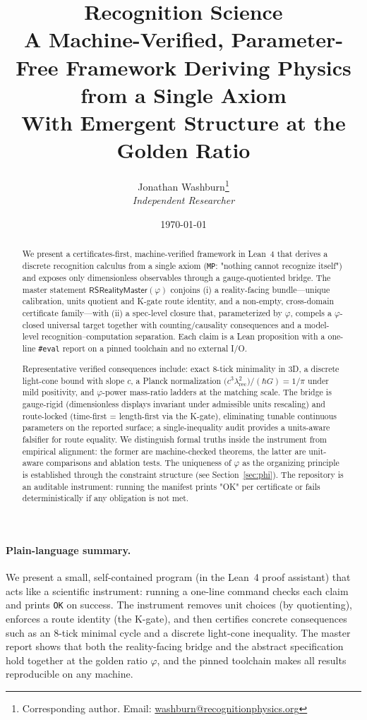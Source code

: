 \documentclass[11pt,a4paper,twoside]{article}
\title{%
    \vspace{-2em}%
    {\huge\bfseries Recognition Science}\\[1em]
    {\Large A Machine-Verified, Parameter-Free Framework Deriving Physics from a Single Axiom}\\[0.8em]
    {\large With Emergent Structure at the Golden Ratio}\\[1.5em]
}
\author{
    Jonathan Washburn\thanks{Corresponding author. Email: \href{mailto:washburn@recognitionphysics.org}{washburn@recognitionphysics.org}}\\
    \textit{Independent Researcher}
}
\date{\today}
\numberwithin{equation}{section}
\theoremstyle{customthm}
\theoremstyle{customdef}
\theoremstyle{customrem}
\begin{document}
\maketitle

\begin{abstract}
\noindent We present a certificates-first, machine-verified framework in Lean~4 that derives a discrete recognition calculus from a single axiom (\texttt{MP}: "nothing cannot recognize itself") and exposes only dimensionless observables through a gauge-quotiented bridge. The master statement $\mathsf{RSRealityMaster}(\varphi)$ conjoins (i) a reality-facing bundle—unique calibration, units quotient and K-gate route identity, and a non-empty, cross-domain certificate family—with (ii) a spec-level closure that, parameterized by $\varphi$, compels a $\varphi$-closed universal target together with counting/causality consequences and a model-level recognition–computation separation. Each claim is a Lean proposition with a one-line \texttt{\#eval} report on a pinned toolchain and no external I/O.

Representative verified consequences include: exact 8-tick minimality in 3D, a discrete light-cone bound with slope $c$, a Planck normalization $\big(c^3\lambda_{\mathrm{rec}}^2\big)/(\hbar G)=1/\pi$ under mild positivity, and $\varphi$-power mass-ratio ladders at the matching scale. The bridge is gauge-rigid (dimensionless displays invariant under admissible units rescaling) and route-locked (time-first = length-first via the K-gate), eliminating tunable continuous parameters on the reported surface; a single-inequality audit provides a units-aware falsifier for route equality. We distinguish formal truths inside the instrument from empirical alignment: the former are machine-checked theorems, the latter are unit-aware comparisons and ablation tests. The uniqueness of $\varphi$ as the organizing principle is established through the constraint structure (see Section~\ref{sec:phi}). The repository is an auditable instrument: running the manifest prints "OK" per certificate or fails deterministically if any obligation is not met.
\end{abstract}

\paragraph{Plain-language summary.} We present a small, self-contained program (in the Lean~4 proof assistant) that acts like a scientific instrument: running a one-line command checks each claim and prints \texttt{OK} on success. The instrument removes unit choices (by quotienting), enforces a route identity (the K-gate), and then certifies concrete consequences such as an 8-tick minimal cycle and a discrete light-cone inequality. The master report shows that both the reality-facing bridge and the abstract specification hold together at the golden ratio $\varphi$, and the pinned toolchain makes all results reproducible on any machine.
\end{document}
